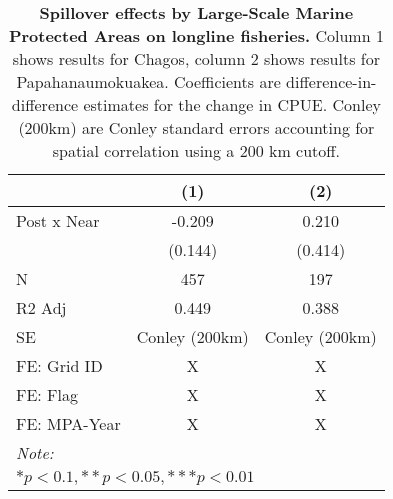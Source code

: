 \begin{table}

\caption{\label{tab:ll_by_mpa_reg}\textbf{Spillover effects by Large-Scale Marine Protected Areas on longline fisheries.}
              Column 1 shows results for Chagos, column 2 shows results for Papahanaumokuakea. Coefficients are
             difference-in-difference estimates for the change in CPUE. Conley (200km) are Conley standard errors accounting for spatial correlation using a 200 km cutoff.}
\centering
\begin{tabular}[t]{lcc}
\toprule
  & (1) & (2)\\
\midrule
Post x Near & -0.209 & 0.210\\
 & (0.144) & (0.414)\\
N & 457 & 197\\
R2 Adj & 0.449 & 0.388\\
SE & Conley (200km) & Conley (200km)\\
\addlinespace
FE: Grid ID & X & X\\
FE: Flag & X & X\\
FE: MPA-Year & X & X\\
\bottomrule
\multicolumn{3}{l}{\rule{0pt}{1em}\textit{Note: }}\\
\multicolumn{3}{l}{\rule{0pt}{1em}$* p < 0.1, ** p < 0.05, *** p < 0.01$}\\
\end{tabular}
\end{table}